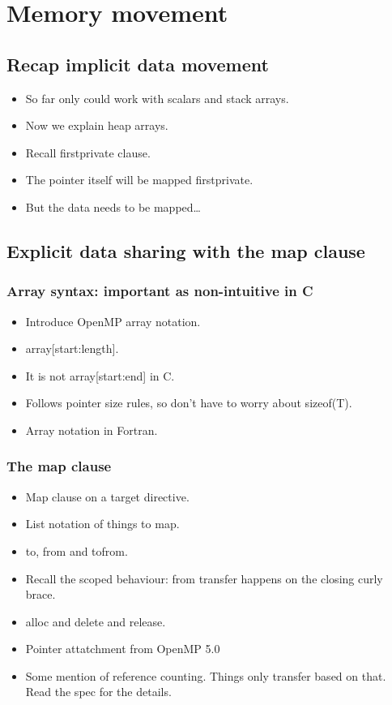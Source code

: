

\chapter{Memory movement}
\label{chapter:memory}

\section{Recap implicit data movement}
\begin{itemize}
  \item So far only could work with scalars and stack arrays.
  \item Now we explain heap arrays.
  \item Recall firstprivate clause.
  \item The pointer itself will be mapped firstprivate.
  \item But the data needs to be mapped\dots
\end{itemize}

\section{Explicit data sharing with the map clause}
\subsection{Array syntax: important as non-intuitive in C}
\begin{itemize}
  \item Introduce OpenMP array notation.
  \item array[start:length].
  \item It is not array[start:end] in C.
  \item Follows pointer size rules, so don't have to worry about sizeof(T).
  \item Array notation in Fortran.
\end{itemize}

\subsection{The map clause}
\begin{itemize}
  \item Map clause on a target directive.
  \item List notation of things to map.
  \item to, from and tofrom.
  \item Recall the scoped behaviour: from transfer happens on the closing curly brace.
  \item alloc and delete and release.
  \item Pointer attatchment from OpenMP 5.0
  \item Some mention of reference counting. Things only transfer based on that. Read the spec for the details.
\end{itemize}


